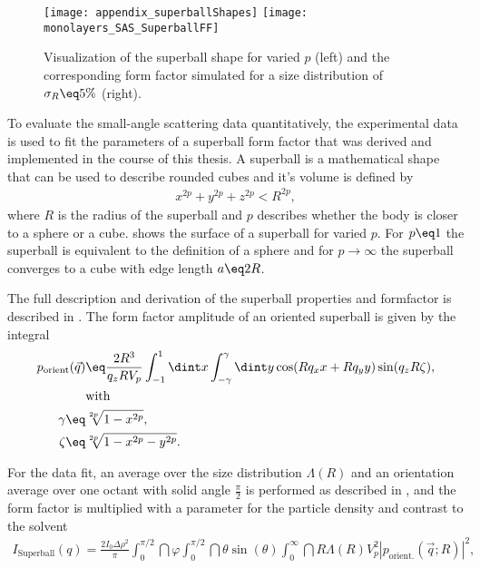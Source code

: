 \documentclass[\main/dresen_thesis.tex]{subfiles}
\begin{document}
  \label{sec:monolayers:methods:superballFF}
    \begin{figure}[tb]
      \centering
      \texttt{[image: appendix\_superballShapes]}
      \texttt{[image: monolayers\_SAS\_SuperballFF]}
      \caption{\label{fig:monolayers:nanoparticle:superballShapes}Visualization of the superball shape for varied $p$ (left) and the corresponding form factor simulated for a size distribution of $\sigma_R \eq 5 \%$ (right).}
    \end{figure}
    To evaluate the small-angle scattering data quantitatively, the experimental data is used to fit the parameters of a superball form factor that was derived and implemented in the course of this thesis.
    A superball is a mathematical shape that can be used to describe rounded cubes and it's volume is defined by
    \begin{align}
      x^{2p} + y^{2p} + z^{2p} < R^{2p},
    \end{align}
    where $R$ is the radius of the superball and $p$ describes whether the body is closer to a sphere or a cube.
     shows the surface of a superball for varied $p$.
    For $p\eq 1$ the superball is equivalent to the definition of a sphere and for $p \rightarrow \infty$ the superball converges to a cube with edge length $a \eq 2R$.

    The full description and derivation of the superball properties and formfactor is described in .
    The form factor amplitude of an oriented superball is given by the integral
    \begin{align}
      \begin{split}
        p_\mathrm{orient}(\vec{q}) &\eq \frac{2R^3}{q_z R V_p} \int_{-1}^{1} \dint x \int_{-\gamma}^{\gamma} \dint y \cos(R q_x x + R q_y y)  \sin (q_z R \zeta),\\
        &\mathrm{with}\\
        \gamma \eq& \sqrt[2p]{1-x^{2p}}, \\
        \zeta \eq& \sqrt[2p]{1-x^{2p} -y^{2p}}.
      \end{split}
    \end{align}

    For the data fit, an average over the size distribution $\Lambda(R)$ and an orientation average over one octant with solid angle $\tfrac{\pi}{2}$ is performed as described in , and the form factor is multiplied with a parameter for the particle density and contrast to the solvent
    \begin{align}
      \label{eq:superballFormfactorIntensity}
      I_\mathrm{Superball}(q) = \frac{2 I_0 \Delta \rho^2}{\pi} \int_0^{\pi/2} \dint \varphi \int_0^{\pi/2} \dint \theta \sin (\theta)  \int_0^\infty \dint R \Lambda(R) V_p^2 |p_\mathrm{orient.}(\vec{q}; R)|^2,
    \end{align}
\end{document}
